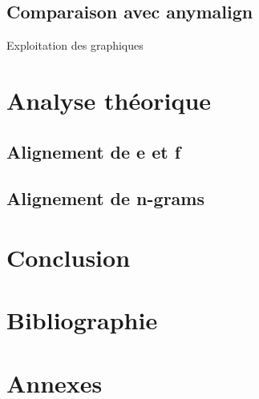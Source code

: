 \documentclass{article}
\begin{document}
\subsection{Comparaison avec anymalign}
Exploitation des graphiques


\section{Analyse théorique}

\subsection{Alignement de e et f}

\subsection{Alignement de n-grams}


\section{Conclusion}


\section{Bibliographie}


\section{Annexes}
\end{document}
